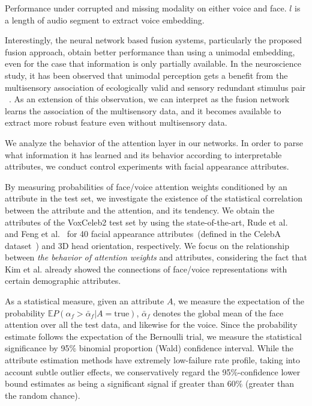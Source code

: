 \documentclass{article}
\begin{document}
\begin{table}[t]
\caption{Performance under corrupted and missing modality on either voice and face. $l$ is a length of audio segment to extract voice embedding.}
\label{tab:missing}
\end{table}

Interestingly, the neural network based fusion systems, particularly the proposed fusion approach, obtain better performance than using a unimodal embedding, even for the case that information is only partially available.
In the neuroscience study, it has been observed that unimodal perception gets a benefit from the multisensory association of ecologically valid and sensory redundant stimulus pair ~\cite{Kreiegstein2006multisensory}.
As an extension of this observation, we can interpret as the fusion network learns the association of the multisensory data, and it becomes available to extract more robust feature even without multisensory data.

We analyze the behavior of the attention layer in our networks.
In order to parse what information it has learned and its behavior according to interpretable attributes, we conduct control experiments with facial appearance attributes.

By measuring probabilities of face/voice attention weights conditioned by an attribute in the test set, we investigate the existence of the statistical correlation between the attribute and the attention, and its tendency.
We obtain the attributes of the VoxCeleb2 test set by using the state-of-the-art, Rude et al.~\cite{rudd2016moon} and Feng et al.~\cite{feng2018prn} for 40 facial appearance attributes~(defined in the CelebA dataset~\cite{Liu2015}) and 3D head orientation, respectively.
We focus on the relationship between \emph{the behavior of attention weights} and attributes, considering the fact that Kim et al. \cite{kim2018learning} already showed the connections of face/voice representations with certain demographic attributes. 

As a statistical measure, given an attribute $A$, we measure the expectation of the probability $\mathbb{E} P(\alpha_f {>} {\bar \alpha}_f|A{=}\textrm{true})$, ${\bar \alpha}_f$ denotes the global mean of the face attention over all the test data, and likewise for the voice.
Since the probability estimate follows the expectation of the Bernoulli trial, we measure the statistical significance by 95$\%$ binomial proportion (Wald) confidence interval.
While the attribute estimation methods have extremely low-failure rate profile, taking into account subtle outlier effects, we conservatively regard the 95$\%$-confidence lower bound estimates as being a significant signal if greater than 60$\%$ (greater than the random chance).
\end{document}
